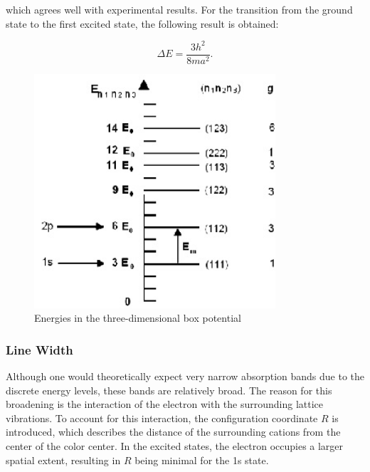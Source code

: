 \documentclass{article}
\begin{document}
which agrees well with experimental results. For the transition from the ground state to the first excited state, the following result is obtained:

\begin{equation*}
\Delta E = \frac{3h^2}{8ma^2}. 
\end{equation*}

\begin{figure}[h]
    \centering
    \includegraphics[width=0.8\textwidth]{Figures/Introduction/Quantum.jpg} %
    \caption{Energies in the three-dimensional box potential \cite{riede_optical}}
    \label{fig:box_potential}
\end{figure}

\pagebreak{}

\subsubsection{Line Width}

Although one would theoretically expect very narrow absorption bands due to the discrete energy levels, these bands are relatively broad. The reason for this broadening is the interaction of the electron with the surrounding lattice vibrations. To account for this interaction, the configuration coordinate $R$ is introduced, which describes the distance of the surrounding cations from the center of the color center. In the excited states, the electron occupies a larger spatial extent, resulting in $R$ being minimal for the 1s state.
\end{document}
